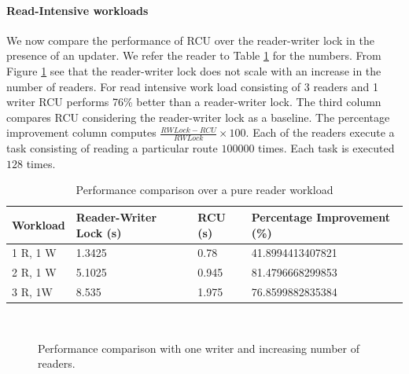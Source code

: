 \documentclass{article}
\begin{document}
\paragraph{Read-Intensive workloads}
We now compare the performance of RCU over the reader-writer lock in the presence of an updater. We refer the reader to Table \ref{tbl:readintensive} for the numbers.
From Figure \ref{chart:readintensive} see that the reader-writer lock does not scale with an increase in the number of readers. For read intensive work load consisting of 3 readers and 1 writer RCU performs 76\% better than a reader-writer lock. The third column compares RCU considering the reader-writer lock as a baseline. The percentage improvement column computes $\frac{RWLock - RCU}{RWLock}\times100$. Each of the readers execute a task consisting of reading a particular route $100000$ times. Each task is executed $128$ times.
\begin{table}
\begin{center}
\begin{tabular}{|l|l|l|l|}
\hline Workload & Reader-Writer Lock (s) & RCU (s) & Percentage Improvement (\%)\\
\hline 1 R, 1 W	& 1.3425 & 0.78	& 41.8994413407821\\
\hline 2 R, 1 W	& 5.1025 & 0.945 & 81.4796668299853\\
\hline 3 R, 1W & 8.535 & 1.975 & 76.8599882835384\\
\hline
\end{tabular}
\end{center}
\label{tbl:readintensive}
\caption{Performance comparison over a pure reader workload}
\end{table}
\\
\begin{figure}[tph]
\begin{center}
\caption{Performance comparison with one writer and increasing number of readers.}
\label{chart:readintensive}
\end{center}
\end{figure}
\\
\end{document}
